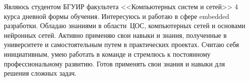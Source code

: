 

\begin{cvparagraph}

Являюсь студентом БГУИР факультета <<Компьютерных систем и сетей>> 4 курса дневной формы обучения. 
Интересуюсь и работаю в сфере embedded разработки. 
Обладаю знаниями в области~ЦОС, компьютерных сетей и основами нейронных сетей.
Активно применяю свои навыки и знания, полученные в университете и самостоятельным путем
в практических проектах. Считаю себя инициативным, умею работать в команде и стремлюсь к 
постоянному профессиональному развитию. Готов применять свои знания и навыки для решения сложных задач.

\end{cvparagraph}
